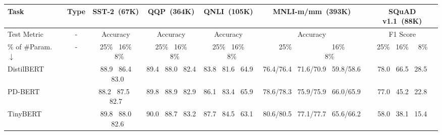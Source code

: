 
	\begin{table}[thb!]
	\centering
	\scriptsize
	\begin{tabular}{l|c|ccccc}
		\toprule
		Task &Type  & SST-2~(67K)                                                  & QQP~(364K)                                                    & QNLI~(105K)                                                   & MNLI-m/mm~(393K)                                                   & SQuAD v1.1~(88K)                                             \\
		\midrule
		 Test Metric&-  & Accuracy                                                  & Accuracy                                                    & Accuracy                                                   & Accuracy                                                   & F1 Score                                            \\
		\midrule 
		\% of \#Param.~$\downarrow$ &- &25\% ~16\%  ~~8\%            &25\% ~16\%  ~~8\%             &25\% ~16\%  ~~8\%            &25\% ~~~~~~~~~	~16\%  ~~~~~~~~~~8\%            &25\% ~16\%  ~~8\%            \\
		\midrule
		DistilBERT    &  & 88.9 ~86.4 ~83.0          & 89.4~ 88.0~ 82.4          & 83.8~ 81.6~ 64.9          & 76.4/76.4 ~71.6/70.9 ~59.8/58.6          & 78.0~ 66.5 ~28.5          \\
		PD-BERT    &     & 88.2~ 87.5~ 82.7          & 89.8 ~88.9 ~82.9          & 86.1~ 83.4~ 65.9          & 78.6/78.3 ~75.9/75.9 ~66.0/65.9          & 77.0 ~45.2~ 22.8          \\
		TinyBERT    &    & 89.8 ~88.0 ~82.6          & 90.0~ 88.7~ 83.2          & 87.7 ~84.5~ 63.1          & 80.6/80.5~ 77.1/77.7~ 65.6/66.2          & 58.0 ~38.1 ~15.4          \\
\midrule

\end{tabular}
\end{table}
